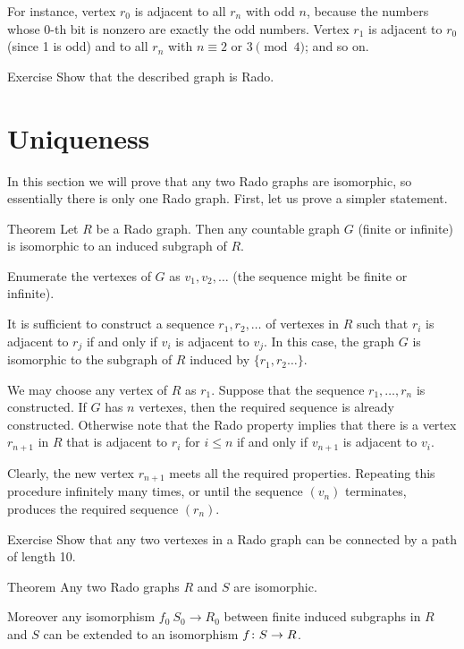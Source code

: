 For instance,  vertex $r_0$ is adjacent to all $r_n$ with odd $n$, because the numbers whose 0-th bit is nonzero are exactly the odd numbers.
Vertex $r_1$ is adjacent to $r_0$ (since 1 is odd) and to all $r_n$ with $n\equiv 2$ or $3 \pmod 4$;
and so on.

\begin{thm}{Exercise}
Show that the described graph is Rado.
\end{thm}


\section*{Uniqueness}

In this section we will prove that any two Rado graphs are isomorphic, so essentially there is only one Rado graph.
First, let us prove a simpler statement.

\begin{thm}{Theorem}\label{thm:rado-subgraph}
Let $R$ be a Rado graph.
Then any countable graph $G$ (finite or infinite) is isomorphic to an induced subgraph of $R$. 
\end{thm}

Enumerate the vertexes of $G$ as $v_1 , v_2 , \dots$ (the sequence might be finite or infinite).

It is sufficient to construct a sequence $r_1,r_2,\dots$ of vertexes in $R$ such that $r_i$ is adjacent to $r_j$ if and only if $v_i$ is adjacent to $v_j$.
In this case, the graph $G$ is isomorphic to the subgraph of $R$ induced by $\{r_1,r_2\dots\}$.

We may choose any vertex of $R$ as $r_1$.
Suppose that the sequence $r_1,\dots,r_n$ is constructed.
If $G$ has $n$ vertexes, then the required sequence is already constructed.
Otherwise note that the Rado property implies that there is a vertex $r_{n+1}$ in $R$ that is adjacent to $r_i$ for $i\le n$ if and only if $v_{n+1}$ is adjacent to $v_i$.

Clearly, the new vertex $r_{n+1}$ meets all the required properties.
Repeating this procedure infinitely many times, or until the sequence $(v_n)$ terminates, produces the required sequence $(r_n)$.
\qeds


\begin{thm}{Exercise} Show that any two vertexes in a Rado graph can be connected by a path of length 10. \end{thm}


\begin{thm}{Theorem}
Any two Rado graphs $R$ and $S$ are isomorphic.

Moreover any isomorphism $f_0\:S_0\to R_0$ between finite induced subgraphs in $R$ and $S$ can be extended to an isomorphism $f\:S\z\to R$.
\end{thm}


